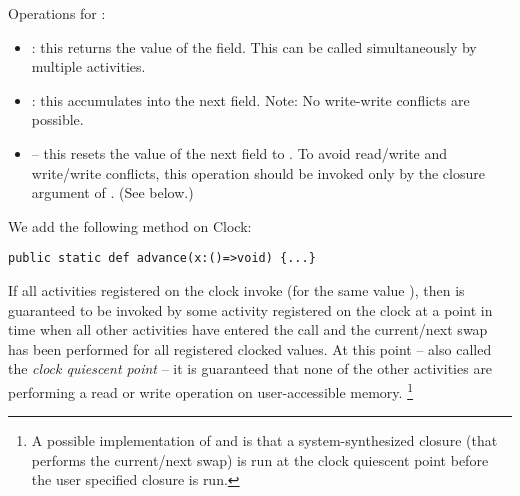 Operations for :
\begin{itemize}
\item {}: this returns the value of the 
  field. This can be called simultaneously by multiple activities.
\item{}:  this accumulates  into the next field. Note: No
     write-write conflicts are possible.
\item{} -- this resets the value of the next field to . To avoid
     read/write and write/write conflicts, this operation should be
     invoked only by the closure argument of
     . (See below.)
\end{itemize}

We add the following method on Clock:
\begin{lstlisting}
public static def advance(x:()=>void) {...}
\end{lstlisting}

If all activities registered on the clock invoke 
(for the same value ), then  is guaranteed to be
invoked by some activity  registered on the clock at a point in time
when all other activities have entered the  call
and the current/next swap has been performed for all registered
clocked values.  At this point -- also called the {\em clock quiescent
point} -- it is guaranteed that none of the other activities are
performing a read or write operation on user-accessible memory.
\footnote{
A possible implementation of  and
 is that a system-synthesized closure (that
performs the current/next swap) is run at the clock quiescent point
before the user specified closure is run.}
